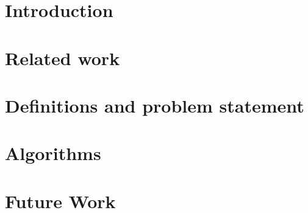 \documentclass{article}
\begin{document}

\clearpage
\section{Introduction}

\section{Related work}

\section{Definitions and problem statement}\label{sec:pf}

\section{Algorithms}

\section{Future Work}



\end{document}

